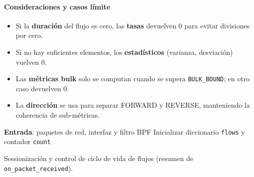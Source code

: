 \paragraph{Consideraciones y casos límite}
\begin{itemize}
  \item Si la \textbf{duración} del flujo es cero, las \textbf{tasas} devuelven 0 para evitar divisiones por cero.
  \item Si no hay suficientes elementos, los \textbf{estadísticos} (varianza, desviación) vuelven 0.
  \item Las \textbf{métricas bulk} solo se computan cuando se supera \texttt{BULK\_BOUND}; en otro caso devuelven 0.
  \item La \textbf{dirección} se usa para separar FORWARD y REVERSE, manteniendo la coherencia de sub-métricas.
\end{itemize}

\begin{algorithm}[H]
\SetAlgoLined
{}
\textbf{Entrada}: paquetes de red, interfaz y filtro BPF\;
Inicializar diccionario \texttt{flows} y contador \texttt{count}\;

\caption{Sessionización y control de ciclo de vida de flujos (resumen de \texttt{on\_packet\_received}).}
\label{alg:on_packet_received}
\end{algorithm}

